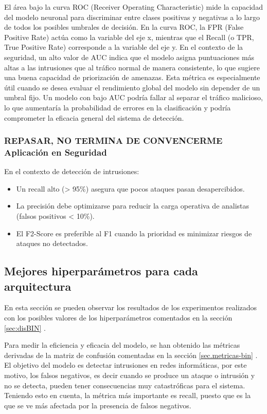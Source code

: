 \begin{itemize}
El área bajo la curva ROC (Receiver Operating Characteristic) mide la capacidad del modelo neuronal para discriminar entre clases positivas y negativas a lo largo de todos los posibles umbrales de decisión. 
En la curva ROC, la FPR (False Positive Rate) actúa como la variable del eje x, mientras que el Recall (o TPR, True Positive Rate) corresponde a la variable del eje y. En el contexto de la seguridad, un alto valor de AUC indica que el modelo asigna puntuaciones más altas a las intrusiones que al tráfico normal de manera consistente, lo que sugiere una buena capacidad de priorización de amenazas. Esta métrica es especialmente útil cuando se desea evaluar el rendimiento global del modelo sin depender de un umbral fijo. Un modelo con bajo AUC podría fallar al separar el tráfico malicioso, lo que aumentaría la probabilidad de errores en la clasificación y podría comprometer la eficacia general del sistema de detección.

\end{itemize}

\subsubsection{REPASAR, NO TERMINA DE CONVENCERME Aplicación en Seguridad}	\label{sec:apli-met-seg}
En el contexto de detección de intrusiones:
\begin{itemize}
    \item Un recall alto (> 95\%) asegura que pocos ataques pasan desapercibidos.
    \item La precisión debe optimizarse para reducir la carga operativa de analistas (falsos positivos < 10\%).
    \item El F2-Score es preferible al F1 cuando la prioridad es minimizar riesgos de ataques no detectados.
\end{itemize}


\subsection{Mejores hiperparámetros para cada arquitectura}
En esta sección se pueden observar los resultados de los experimentos realizados con los posibles valores de los hiperparámetros comentados en la sección \ref{sec:disBIN} .

Para medir la eficiencia y eficacia del modelo, se han obtenido las métricas derivadas de la matriz de confusión comentadas en la sección \ref{sec.metricas-bin} . El objetivo del modelo es detectar intrusiones en redes informáticas, por este motivo, los falsos negativos, es decir cuando se produce un ataque o intrusión y no se detecta, pueden tener consecuencias muy catastróficas para el sistema. Teniendo esto en cuenta, la métrica más importante es recall, puesto que es la que se ve más afectada por la presencia de falsos negativos.

